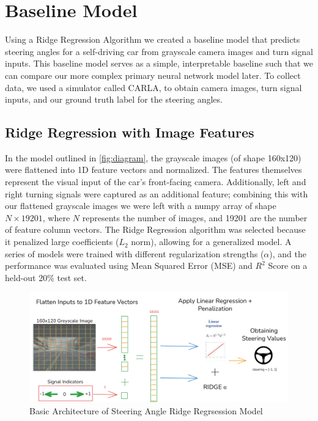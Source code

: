 \documentclass{article} %
\begin{document}
\section{Baseline Model}

Using a Ridge Regression Algorithm we created a baseline model that predicts steering angles for a self-driving car 
from grayscale camera images and turn signal inputs. This baseline model serves as a simple, interpretable baseline
such that we can compare our more complex primary neural network model later. To collect data, we used a simulator
called CARLA, to obtain camera images, turn signal inputs, and our ground truth label for the steering angles.


\subsection{Ridge Regression with Image Features}

In the model outlined in \autoref{fig:diagram}, the grayscale images (of shape 160x120) were flattened into 1D feature vectors and normalized. The features themselves
represent the visual input of the car's front-facing camera. Additionally, left and right turning signals were captured as an
additional feature; combining this with our flattened grayscale images we were left with a numpy array of shape $N \times 19201$,
where $N$ represents the number of images, and 19201 are the number of feature column vectors. The Ridge Regression algorithm was
selected because it penalized large coefficients ($L_2$ norm), allowing for a generalized model. A series of models were trained
with different regularization strengths ($\alpha$), and the performance was evaluated using Mean Squared Error (MSE) and $R^2$ Score
on a held-out 20\% test set. 

\begin{figure}[H] %
    \centering
    \includegraphics[width=1.0\textwidth]{diagram.png} %
    \caption{Basic Architecture of Steering Angle  Ridge Regrsession Model}
    \label{fig:diagram}
\end{figure}
\end{document}
